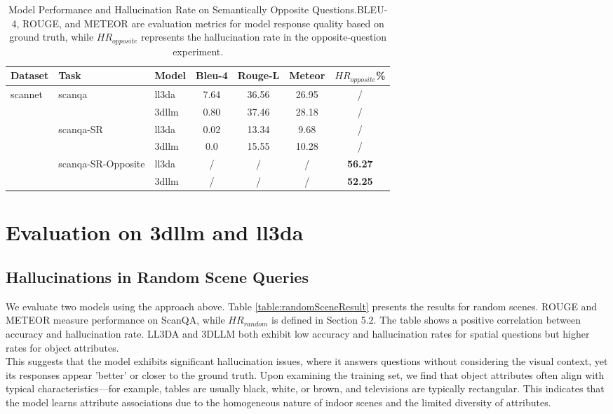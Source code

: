 \begin{table*}[h]
\centering
\small
\begin{tabular}{lllcccc}
\hline
Dataset & Task &Model & Bleu-4  & Rouge-L & Meteor   &\textbf{$HR_{opposite}$\%}  \\ \hline
\multirow{6}{*}{scannet}&\multirow{2}{*}{scanqa}&ll3da&7.64&36.56&26.95&/\\ 
& &3dllm&0.80&37.46&28.18&/ \\  \cline{2-7}
&\multirow{2}{*}{scanqa-SR}&ll3da&0.02&13.34&9.68&/ \\ 
&&3dllm&0.0&15.55&10.28&/ \\   \cline{2-7}
&\multirow{2}{*}{scanqa-SR-Opposite}&ll3da&/&/&/&\textbf{56.27} \\ 
&&3dllm&/&/&/&\textbf{52.25} \\ \hline
\end{tabular}
\caption{Model Performance and Hallucination Rate on Semantically Opposite Questions.BLEU-4, ROUGE, and METEOR are evaluation metrics for model response quality based on ground truth, while $HR_{opposite}$ represents the hallucination rate in the opposite-question experiment.}
\label{table:oppositeQuestionResult}
\end{table*}
\section{Evaluation on 3dllm and ll3da}
\subsection{Hallucinations in Random Scene Queries}
We evaluate two models using the approach above. Table \ref{table:randomSceneResult} presents the results for random scenes. ROUGE and METEOR measure performance on ScanQA, while $HR_{random}$ is defined in Section 5.2. The table shows a positive correlation between accuracy and hallucination rate. LL3DA and 3DLLM both exhibit low accuracy and hallucination rates for spatial questions but higher rates for object attributes.\\
This suggests that the model exhibits significant hallucination issues, where it answers questions without considering the visual context, yet its responses appear 'better' or closer to the ground truth. Upon examining the training set, we find that object attributes often align with typical characteristics—for example, tables are usually black, white, or brown, and televisions are typically rectangular. This indicates that the model learns attribute associations due to the homogeneous nature of indoor scenes and the limited diversity of attributes.
